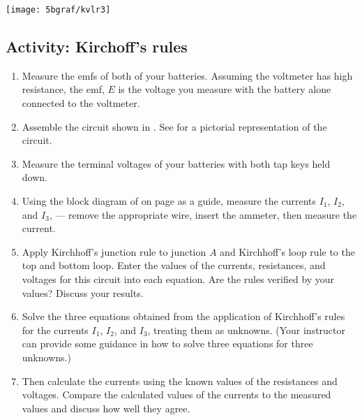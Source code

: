 \begin{multicols}{2}
\begin{center}
	\texttt{[image: 5bgraf/kvlr3]}	 %
	\label{f:kvlr3}
\end{center}

\subsection{Activity: Kirchoff's rules}
\begin{enumerate}
	 \item Measure the emfs of both of your batteries.  Assuming the voltmeter has high resistance, the emf, $E$ is the voltage you measure with the battery alone connected to the voltmeter.
	\item Assemble the circuit shown in .
	See  for a pictorial representation of the circuit.
	\item Measure the terminal voltages of your batteries with both tap keys held down.
	\item Using the block diagram of  on page \pageref{f:fig10b} as a guide, measure the currents $I_1$, $I_2$, and $I_3$, --- remove the appropriate wire, insert the ammeter, then measure the current.
	\item Apply Kirchhoff's junction rule to junction $A$ and Kirchhoff's loop rule to the top and bottom loop.  Enter the values of the currents, resistances, and voltages for this circuit into each equation.  Are the rules verified by your values? Discuss your results.
	\item Solve the three equations obtained from the application of Kirchhoff's rules for the currents $I_1$, $I_2$, and $I_3$, treating them as unknowns. (Your instructor can provide some guidance in how to solve three equations for three unknowns.)
	\item Then calculate the currents using the known values of the resistances and voltages.  Compare the calculated values of the currents to the measured values and discuss how well they agree. 
\end{enumerate}

%


\end{multicols}
